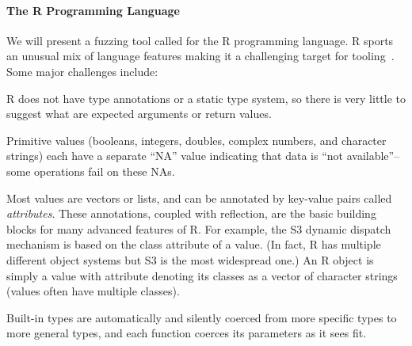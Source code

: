 \documentclass[sigplan,anonymous,review]{acmart}
\begin{document}
\paragraph{The R Programming Language}

We will present a fuzzing tool called \tool for the R programming language.
R sports an unusual mix of language features making it a challenging target for
tooling~\cite{morandat2012evaluating}. 
Some major challenges include:

\begin{compactitem}[$-$]

\item R does not have type annotations or a static type system, so there is very little to suggest what are expected arguments or return values.

\item Primitive values (booleans, integers, doubles, complex numbers, and character strings) each have a separate ``NA'' value indicating that data is ``not available''--some operations fail on these NAs.

\item Most values are vectors or lists, and can be annotated by key-value pairs called \textit{attributes}. 
These annotations, coupled with reflection, are the basic building blocks for many advanced features of R. 
For example, the S3 dynamic dispatch mechanism is based on the class attribute of a value.
(In fact, R has multiple different object systems but S3 is the most widespread one.)
An R object is simply a value with  attribute denoting its classes as a vector of character strings (values often have multiple classes).

\item Built-in types are automatically and silently coerced from more specific types to more general types, and each function coerces its parameters as it sees fit.



\end{compactitem}
\end{document}
